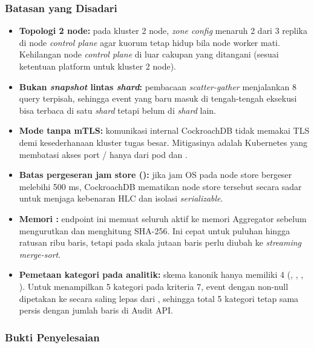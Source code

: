 \subsubsection{Batasan yang Disadari}
\begin{itemize}
\item \textbf{Topologi 2 node:} pada kluster 2 node, \textit{zone config} menaruh 2 dari 3 replika di node \textit{control plane} agar kuorum tetap hidup bila node worker mati. Kehilangan node \textit{control plane} di luar cakupan yang ditangani (sesuai ketentuan platform untuk kluster 2 node).
\item \textbf{Bukan \textit{snapshot} lintas \textit{shard}:} pembacaan \textit{scatter-gather} menjalankan 8 query terpisah, sehingga event yang baru masuk di tengah-tengah eksekusi bisa terbaca di satu \textit{shard} tetapi belum di \textit{shard} lain.
\item \textbf{Mode  tanpa mTLS:} komunikasi internal CockroachDB tidak memakai TLS demi kesederhanaan kluster tugas besar. Mitigasinya adalah Kubernetes  yang membatasi akses port / hanya dari pod  dan .
\item \textbf{Batas pergeseran jam store ():} jika jam OS pada node store bergeser melebihi 500 ms, CockroachDB mematikan node store tersebut secara sadar untuk menjaga kebenaran HLC dan isolasi \textit{serializable}.
\item \textbf{Memori :} endpoint ini memuat seluruh  aktif ke memori Aggregator sebelum mengurutkan dan menghitung SHA-256. Ini cepat untuk puluhan hingga ratusan ribu baris, tetapi pada skala jutaan baris perlu diubah ke \textit{streaming merge-sort}.
\item \textbf{Pemetaan kategori  pada analitik:} skema kanonik hanya memiliki 4  (, , , ). Untuk menampilkan 5 kategori pada kriteria 7, event  dengan  non-null dipetakan ke  secara saling lepas dari , sehingga total 5 kategori tetap sama persis dengan jumlah baris di Audit API.
\end{itemize}

\subsubsection{Bukti Penyelesaian}

